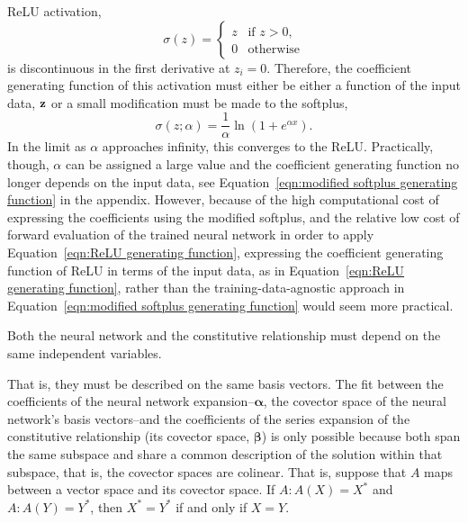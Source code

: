 ReLU activation,
\[
    \sigma(z) = \begin{cases}
            z   & \mbox{if } z > 0, \\
            0   & \mbox{otherwise}
        \end{cases}
\]
is discontinuous in the first derivative at $z_i = 0$. Therefore, the coefficient generating function of this activation must either be either a function of the input data, ${\bf z}$ or a small modification must be made to the softplus,
\begin{equation}
    \sigma(z; \alpha) = \frac{1}{\alpha} \ln\left( 1 + e^{\alpha x} \right).
    \label{eqn:modified softmax}
\end{equation}
In the limit as $\alpha$ approaches infinity, this converges to the ReLU. Practically, though, $\alpha$ can be assigned a large value and the coefficient generating function no longer depends on the input data, see Equation~\ref{eqn:modified softplus generating function} in {\color{red} the appendix}. However, because of the high computational cost of expressing the coefficients using the modified softplus, and the relative low cost of forward evaluation of the trained neural network in order to apply Equation~\ref{eqn:ReLU generating function}, expressing the coefficient generating function of ReLU in terms of the input data, as in Equation~\ref{eqn:ReLU generating function}, rather than the training-data-agnostic approach in Equation~\ref{eqn:modified softplus generating function} would seem more practical.

\begin{condition}
    Both the neural network and the constitutive relationship must depend on the same independent variables.
\end{condition}
That is, they must be described on the same basis vectors. The fit between the coefficients of the neural network expansion--$\boldsymbol{\alpha}$, the covector space of the neural network's basis vectors--and the coefficients of the series expansion of the constitutive relationship (its covector space, $\boldsymbol{\beta}$) is only possible because both span the same subspace and share a common description of the solution within that subspace, that is, the covector spaces are colinear. That is, suppose that $A$ maps between a vector space and its covector space. If $A: A(X) = X^*$ and $A: A(Y) = Y^*$, then $X^* = Y^*$ if and only if $X = Y$.


